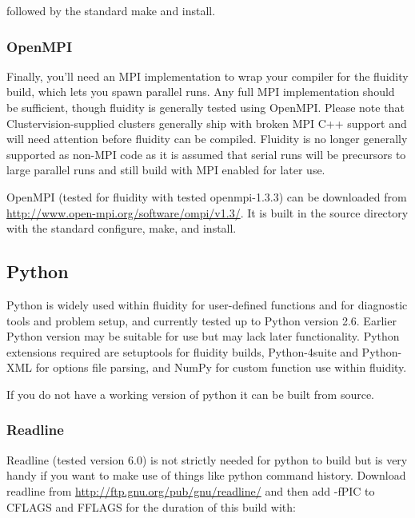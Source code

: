 followed by the standard make and install.

\subsubsection{OpenMPI}
\label{sect:required_libraries_compilers_openmpi}

Finally, you'll need an MPI implementation to wrap your compiler for the fluidity
build, which lets you spawn parallel runs. Any full MPI implementation should
be sufficient, though fluidity is generally tested using OpenMPI. Please note
that Clustervision-supplied clusters generally ship with broken MPI C++ support
and will need attention before fluidity can be compiled. Fluidity is no longer
generally supported as non-MPI code as it is assumed that serial runs will be
precursors to large parallel runs and still build with MPI enabled for later
use.

OpenMPI (tested for fluidity with tested openmpi-1.3.3) can be downloaded from
\url{http://www.open-mpi.org/software/ompi/v1.3/}. It is built in the source
directory with the standard configure, make, and install.

\subsection{Python}
\label{sect:required_libraries_python}

Python is widely used within fluidity for user-defined functions and for
diagnostic tools and problem setup, and currently tested up to Python version
2.6. Earlier Python version may be suitable for use but may lack later
functionality. Python extensions required are setuptools for fluidity builds,
Python-4suite and Python-XML for options file parsing, and NumPy for custom
function use within fluidity.

If you do not have a working version of python it can be built from source. 

\subsubsection{Readline}
\label{sect:required_libraries_python_readline}

Readline (tested version 6.0) is not strictly needed for python to build but is
very handy if you want to make use of things like python command history.
Download readline from \url{http://ftp.gnu.org/pub/gnu/readline/} and then add
-fPIC to CFLAGS and FFLAGS for the duration of this build with:

